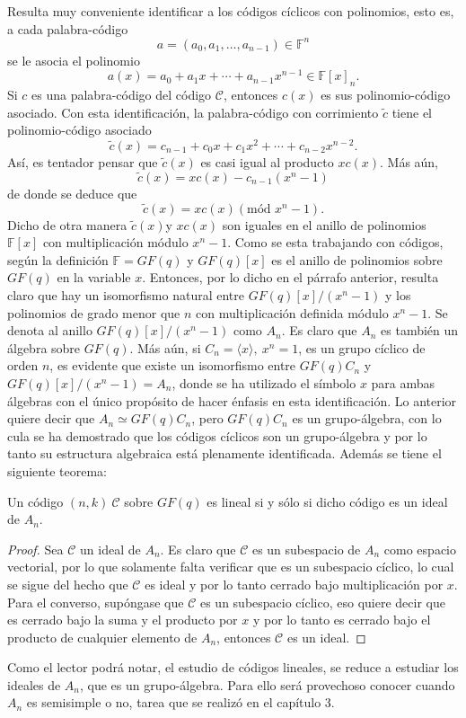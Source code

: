 Resulta muy conveniente identificar a los códigos cíclicos con polinomios, esto es, a cada palabra-código
\[ a = (a_0, a_1, \dots , a_{n-1}) \in \mathds{F}^n \] se le asocia el polinomio \[ a(x) = a_0 + a_1x+ \cdots + a_{n-1}x^{n-1} \in \mathds{F}[x]_n .\] Si $c$ es una palabra-código del código $\mathcal{C}$, entonces $c(x)$ es sus polinomio-código asociado. Con esta identificación, la palabra-código con corrimiento $\tilde{c}$ tiene el polinomio-código asociado \[ \tilde{c}(x) = c_{n-1} + c_0x + c_1x^2 + \cdots + c_{n-2}x^{n-2}. \] Así, es tentador pensar que $\tilde{c}(x) $ es casi igual al producto $xc(x)$. Más aún, 
\[ \tilde{c}(x) = xc(x) - c_{n-1}(x^n -1)  \] de donde se deduce que \[ \tilde{c}(x) = xc(x) (\mbox{mód } x^n-1) .\] Dicho de otra manera $\tilde{c}(x)$y $xc(x)$ son iguales en el anillo de polinomios $\mathds{F}[x]$ con multiplicación módulo $x^n-1$. Como se esta trabajando con códigos, según la definición $\mathds{F} = GF(q) $ y $GF(q)[x]$ es el anillo de polinomios sobre $GF(q)$ en la variable $x$. Entonces, por lo dicho en el párrafo anterior, resulta claro que hay un isomorfismo natural entre $GF(q)[x]/(x^n-1)$ y los polinomios de grado menor que $n$ con multiplicación definida módulo $x^n-1$. Se denota al anillo $GF(q)[x]/(x^n-1)$ como $A_n$. Es claro que $A_n$ es también un álgebra sobre $GF(q)$. Más aún, si $C_n = \langle x \rangle,\ x^n =1$, es un grupo cíclico de orden $n$, es evidente que existe un isomorfismo entre $GF(q)C_n$ y $GF(q)[x]/(x^n-1) = A_n$, donde se ha utilizado el símbolo $x$ para ambas álgebras con el único propósito de hacer énfasis en esta identificación.
Lo anterior quiere decir que $A_n \simeq GF(q)C_n$, pero $GF(q)C_n$ es un grupo-álgebra, con lo cula se ha demostrado que los códigos cíclicos son un grupo-álgebra y por lo tanto su estructura algebraica está plenamente identificada. Además se tiene el siguiente teorema:
\begin{teorema}
Un código $(n,k) \ \mathcal{C}$ sobre $GF(q)$ es lineal si y sólo si dicho código es un ideal de $A_n$.
\end{teorema}
\begin{proof}
Sea $\mathcal{C}$ un ideal de $A_n$. Es claro que $\mathcal{C}$ es un subespacio de $A_n$ como espacio vectorial, por lo que solamente falta verificar que es un subespacio cíclico, lo cual se sigue del hecho que $\mathcal{C}$ es ideal y por lo tanto cerrado bajo multiplicación por $x$.
Para el converso, supóngase que $\mathcal{C}$ es un subespacio cíclico, eso quiere decir que es cerrado bajo la suma y el producto por $x$ y por lo tanto es cerrado bajo el producto de cualquier elemento de $A_n$, entonces $\mathcal{C}$ es un ideal.
\end{proof}
Como el lector podrá notar, el estudio de códigos lineales, se reduce a estudiar los ideales de $A_n$, que es un grupo-álgebra. Para ello será provechoso conocer cuando $A_n$ es semisimple o no, tarea que se realizó en el capítulo 3. 



